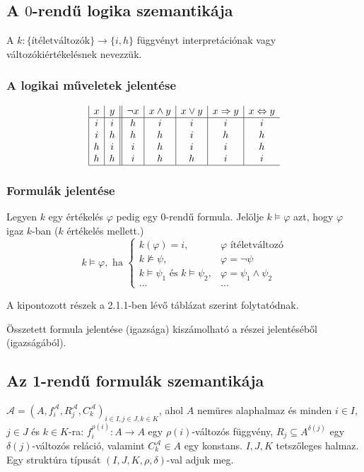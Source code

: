 \subsection{A $0$-rendű logika szemantikája}
\begin{defi}{A $k:\lbrace \text{ítéletváltozók} \rbrace \rightarrow \lbrace i, h \rbrace$} függvényt interpretációnak vagy változókiértékelésnek nevezzük.
\end{defi}
\subsubsection{A logikai műveletek jelentése}
\begin{displaymath}
\begin{array}{|c|c||c|c|c|c|c}
   x
 & y
 & \lnot{}x
 & x\land{}y
 & x\lor{}y
 & x\Rightarrow y
 & x\Leftrightarrow{}y \\
\hline
i & i & h & i & i & i & i \\
i & h & h & h & i & h & h \\
h & i & i & h & i & i & h \\
h & h & i & h & h & i & i \\
\hline
\end{array}
\end{displaymath}
\subsubsection{Formulák jelentése}
\begin{defi}{Legyen $k$ egy értékelés $\varphi$ pedig egy $0$-rendű formula. Jelölje $k \models \varphi$ azt, hogy $\varphi$ igaz $k$-ban ($k$ értékelés mellett.) 
$$k \models \varphi, \text{ ha } 
\begin{cases}
k(\varphi) = i, & \varphi \text{ ítéletváltozó} \\
k \not\models \psi, & \varphi = \lnot \psi \\
k \models \psi_1 \text{ és } k \models \psi_2, & \varphi = \psi_1 \land \psi_2 \\
... & ...
\end{cases}$$}
\end{defi}
A kipontozott részek a 2.1.1-ben lévő táblázat szerint folytatódnak.
\begin{megj}
Összetett formula jelentése (igazsága) kiszámolható a részei jelentéséből (igazságából).
\end{megj}
\subsection{Az 1-rendű formulák szemantikája}
\begin{defi}
$\mathcal{A} = (A,f_i^\mathcal{A},R_j^\mathcal{A},C_k^\mathcal{A})_{i \in I, j \in J, k \in K}$, ahol $A$ nemüres alaphalmaz és minden $i \in I$, $j \in J$ és $k \in K$-ra: $f_i^{\rho(i)} : A \rightarrow A$ egy $\rho(i)$-változós függvény, $R_j \subseteq A^{\delta(j)}$ egy $\delta(j)$-változós reláció, valamint $C^{\mathcal{A}}_k \in A$ egy konstans. $I, J, K$ tetszőleges halmaz. Egy struktúra típusát $(I,J,K,\rho,\delta)$-val adjuk meg.
\end{defi}


